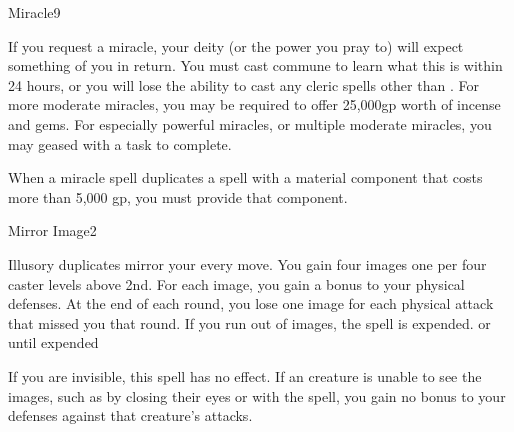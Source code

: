 \begin{spellsection}{Miracle}{9}
\begin{spellcontent}
\end{spellcontent}
\begin{spellfooter}
    \spellnotes If you request a miracle, your deity (or the power you pray to) will expect something of you in return. You must cast commune to learn what this is within 24 hours, or you will lose the ability to cast any cleric spells other than . For more moderate miracles, you may be required to offer 25,000gp worth of incense and gems. For especially powerful miracles, or multiple moderate miracles, you may geased with a task to complete.
    \par When a miracle spell duplicates a spell with a material component that costs more than 5,000 gp, you must provide that component.
\end{spellfooter}
\end{spellsection}

\begin{spellsection}{Mirror Image}{2}
\begin{spellheader}
\end{spellheader}
\begin{spellcontent}
    \begin{spelltargetinginfo}
    \end{spelltargetinginfo}
    \begin{spelleffects}
        \spelleffect Illusory duplicates mirror your every move. You gain four images \add one per four caster levels above 2nd. For each image, you gain a  bonus to your physical defenses. At the end of each round, you lose one image for each physical attack that missed you that round. If you run out of images, the spell is expended.
        \spelldur \durshort or until expended \dismissable
    \end{spelleffects}
\end{spellcontent}
\begin{spellfooter}
    \spellnotes If you are invisible, this spell has no effect. If an creature is unable to see the images, such as by closing their eyes or with the  spell, you gain no bonus to your defenses against that creature's attacks.
\end{spellfooter}
\end{spellsection}


